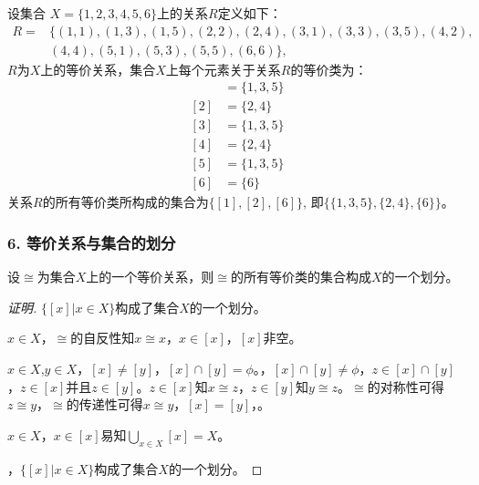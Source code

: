 \documentclass{beamer}
\begin{document}
\begin{CJK*}{UTF8}{gbsn}
\begin{frame}
\begin{Thm6.2}
  \end{Thm6.2}
  \pause
    设集合
    $X=\{1,2,3,4,5,6 \}$上的关系$R$定义如下：
    \begin{align*}
      R=&\{(1,1),(1,3),(1,5),(2,2),(2,4),(3,1),(3,3),(3,5),(4,2),\\
      &(4,4),(5,1),(5,3),(5,5),(6,6)\},
    \end{align*}
      $R$为$X$上的等价关系，集合$X$上每个元素关于关系$R$的等价类为：
      \begin{align*}
        [1]&=\{1,3,5\}\\
        [2]&=\{2,4\}\\
        [3]&=\{1,3,5\}\\
        [4]&=\{2,4\}\\
        [5]&=\{1,3,5\}\\
        [6]&=\{6\}
      \end{align*}
      关系$R$的所有等价类所构成的集合为$\{[1],[2],[6]\}$, 即$\{\{1,3,5\},\{2,4\},\{6\}\}$。

\end{frame}

\begin{frame}
  \frametitle{6. 等价关系与集合的划分}
  \begin{Thm}
    设$\cong$为集合$X$上的一个等价关系，则$\cong$的所有等价类的集合构成$X$的一个划分。
  \end{Thm}
  \pause
  \begin{proof}[证明]\justifying\let\raggedright\justifying
    $\{[x]|x\in X\}$构成了集合$X$的一个划分。

    $x\in X$，$\cong$的自反性知$x\cong x$，$x\in [x]$，$[x]$非空。

    $x\in X$,\pause$y\in X$，$[x]\neq [y]$，$[x]\cap [y]=\phi$。，$[x]\cap [y]\neq \phi$，$z\in [x]\cap [y]$，$z\in [x]$并且$z\in [y]$。$z\in [x]$知$x\cong z$，$z\in [y]$知$y\cong z$。$\cong$的对称性可得$z\cong y$，$\cong$的传递性可得$x\cong y$，$[x]=[y]$，。

    $x\in X$，\pause$x\in [x]$易知$\bigcup_{x\in X}[x]=X$。

    ，$\{[x]|x\in X\}$构成了集合$X$的一个划分。
  \end{proof}
  

\end{frame}
\end{CJK*}
\end{document}
